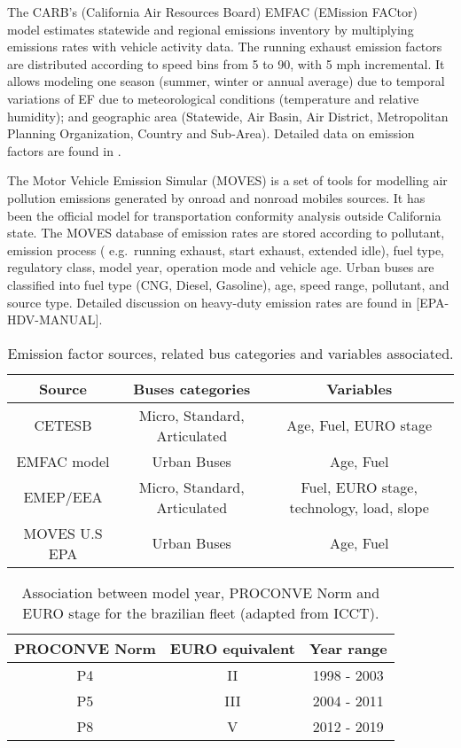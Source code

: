\documentclass[gc, manuscript]{copernicus}
\begin{document}
The CARB's (California Air Resources Board) EMFAC (EMission FACtor)
model estimates statewide and regional emissions inventory by
multiplying emissions rates with vehicle activity data. The running
exhaust emission factors are distributed according to speed bins from 5
to 90, with 5 mph incremental. It allows modeling one season (summer,
winter or annual average) due to temporal variations of EF due to
meteorological conditions (temperature and relative humidity); and
geographic area (Statewide, Air Basin, Air District, Metropolitan
Planning Organization, Country and Sub-Area). Detailed data on emission
factors are found in \citet{noauthor_emfac_nodate}.

The Motor Vehicle Emission Simular (MOVES) is a set of tools for
modelling air pollution emissions generated by onroad and nonroad
mobiles sources. It has been the official model for transportation
conformity analysis outside California state. The MOVES database of
emission rates are stored according to pollutant, emission process (
e.g.~running exhaust, start exhaust, extended idle), fuel type,
regulatory class, model year, operation mode and vehicle age. Urban
buses are classified into fuel type (CNG, Diesel, Gasoline), age, speed
range, pollutant, and source type. Detailed discussion on heavy-duty
emission rates are found in {[}EPA-HDV-MANUAL{]}.

\begin{table*}[t]
\caption{Emission factor sources, related bus categories and variables associated.}
\begin{tabular}{ccc}
\hline
Source & Buses categories & Variables \\ \hline
CETESB & Micro, Standard, Articulated & Age, Fuel, EURO stage \\
EMFAC model & Urban Buses & Age, Fuel \\
EMEP/EEA & Micro, Standard, Articulated & Fuel, EURO stage, technology, load, slope \\
MOVES U.S EPA & Urban Buses & Age, Fuel \\
\hline
\end{tabular}
\end{table*}

\begin{table*}[t]
\caption{Association between model year, PROCONVE Norm and EURO stage for the brazilian fleet (adapted from ICCT).}
\begin{tabular}{ccc}
\hline
PROCONVE Norm & EURO equivalent & Year range \\ \hline
P4  & II  & 1998 - 2003 \\
P5  & III  & 2004 - 2011 \\
P8  & V & 2012 - 2019\\
\hline
\end{tabular}
\end{table*}
\end{document}
